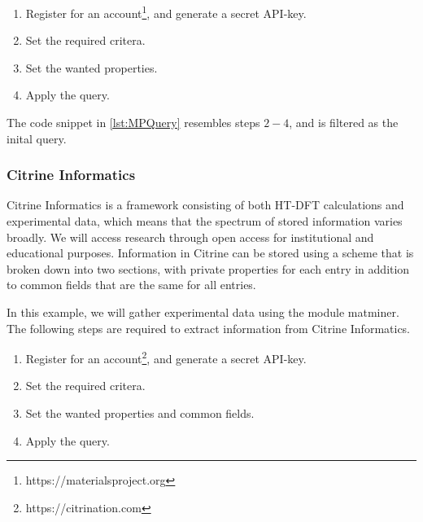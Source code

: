 \begin{enumerate}
  \item Register for an account\footnote{https://materialsproject.org}, and generate a secret API-key.
  \item Set the required critera.
  \item Set the wanted properties.
  \item Apply the query.
\end{enumerate}

The code snippet in \autoref{lst:MPQuery} resembles steps $2-4$, and is filtered as the inital query. %

\subsubsection{Citrine Informatics}

Citrine Informatics is a framework consisting of both HT-DFT calculations and experimental data, which means that the spectrum of stored information varies broadly. We will access research through open access for institutional and educational purposes. Information in Citrine can be stored using a scheme that is broken down into two sections, with private properties for each entry in addition to common fields that are the same for all entries.%

In this example, we will gather experimental data using the module matminer. The following steps are required to extract information from Citrine Informatics.

\begin{enumerate}
  \item Register for an account\footnote{https://citrination.com}, and generate a secret API-key.
  \item Set the required critera.
  \item Set the wanted properties and common fields.
  \item Apply the query.
\end{enumerate}

